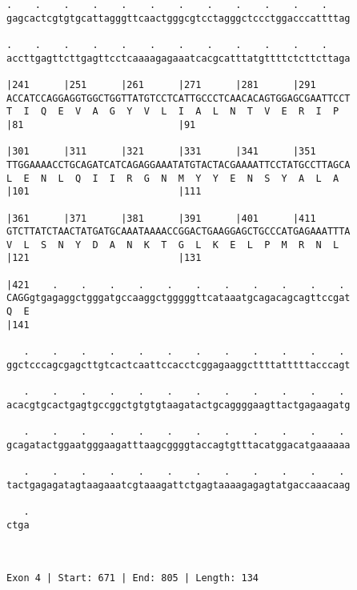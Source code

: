 \documentclass{article}
\begin{document}
\begin{Verbatim}
.    .    .    .    .    .    .    .    .    .    .    .    
gagcactcgtgtgcattagggttcaactgggcgtcctagggctccctggacccattttag
                                                            
.    .    .    .    .    .    .    .    .    .    .    .    
accttgagttcttgagttcctcaaaagagaaatcacgcatttatgttttctcttcttaga
                                                            
|241      |251      |261      |271      |281      |291      
ACCATCCAGGAGGTGGCTGGTTATGTCCTCATTGCCCTCAACACAGTGGAGCGAATTCCT
T  I  Q  E  V  A  G  Y  V  L  I  A  L  N  T  V  E  R  I  P  
|81                           |91                           
  
|301      |311      |321      |331      |341      |351      
TTGGAAAACCTGCAGATCATCAGAGGAAATATGTACTACGAAAATTCCTATGCCTTAGCA
L  E  N  L  Q  I  I  R  G  N  M  Y  Y  E  N  S  Y  A  L  A  
|101                          |111                          
  
|361      |371      |381      |391      |401      |411      
GTCTTATCTAACTATGATGCAAATAAAACCGGACTGAAGGAGCTGCCCATGAGAAATTTA
V  L  S  N  Y  D  A  N  K  T  G  L  K  E  L  P  M  R  N  L  
|121                          |131                          
  
|421    .    .    .    .    .    .    .    .    .    .    . 
CAGGgtgagaggctgggatgccaaggctgggggttcataaatgcagacagcagttccgat
Q  E                                                        
|141                                                        
  
   .    .    .    .    .    .    .    .    .    .    .    . 
ggctcccagcgagcttgtcactcaattccacctcggagaaggcttttatttttacccagt
                                                            
   .    .    .    .    .    .    .    .    .    .    .    . 
acacgtgcactgagtgccggctgtgtgtaagatactgcaggggaagttactgagaagatg
                                                            
   .    .    .    .    .    .    .    .    .    .    .    . 
gcagatactggaatgggaagatttaagcggggtaccagtgtttacatggacatgaaaaaa
                                                            
   .    .    .    .    .    .    .    .    .    .    .    . 
tactgagagatagtaagaaatcgtaaagattctgagtaaaagagagtatgaccaaacaag
                                                            
   .
ctga
    
    
 
Exon 4 | Start: 671 | End: 805 | Length: 134




\end{Verbatim}
\end{document}
